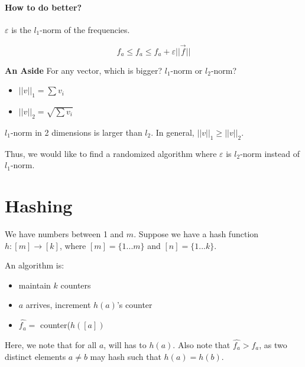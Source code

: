 \documentclass[11pt]{article}
\begin{document}
\smallskip

\paragraph{How to do better?} $\varepsilon$ is the $l_1$-norm of the frequencies.

\[\hat{f_a} \leq f_a \leq \hat{f_a} + \varepsilon ||\vec{f}||\]

\smallskip

\begin{mdframed}[backgroundcolor=blue!05,topline=false,bottomline=false,leftline=false,rightline=false] 
	\textbf{An Aside}
	For any vector, which is bigger? $l_1$-norm or $l_2$-norm?
	\begin{itemize}
	
		\item $||v||_1 = \sum v_i$
		
		\item $||v||_2 = \sqrt{\sum v_i}$
	
	\end{itemize}
	
	$l_1$-norm in 2 dimensions is larger than $l_2$. In general, $||v||_1 \geq ||v||_2$. 
	
\end{mdframed}

Thus, we would like to find a randomized algorithm where $\varepsilon$ is $l_2$-norm instead of $l_1$-norm.

\section*{Hashing}
We have numbers between 1 and $m$. Suppose we have a hash function $h: [m] \rightarrow [k]$, where $[m] = \{1...m\}$ and $[n] = \{1...k\}$.

\smallskip

An algorithm is:
\begin{itemize}

	\item maintain $k$ counters
	
	\item $a$ arrives, increment $h(a)$'s counter
	
	\item $\hat{f_a} =$ counter($h([a])$

\end{itemize}

Here, we note that for all $a$, will has to $h(a)$. Also note that $\hat{f_a} > f_a$, as two distinct elements $a \neq b$ may hash such that $h(a)= h(b)$. 
\end{document}

